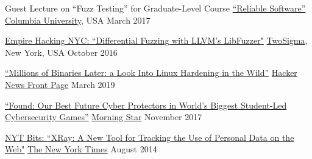 \vspace{0.025in}
\begin{cvhonorswide2}
\cvhonorwide
    {}
    {Guest Lecture on ``Fuzz Testing'' for Graduate-Level Course \href{http://www.cs.columbia.edu/~junfeng/17sp-e6121/syllabus.html}{``Reliable Software''}}
    {\href{http://www.cs.columbia.edu/}{Columbia University}, USA}
    {March 2017}
\end{cvhonorswide2}

\vspace{0.025in}
\begin{cvhonorswide2}
  \cvhonorwide
    {}
    {\href{https://www.meetup.com/Empire-Hacking/events/231863227/?_af=event&_af_eid=231863227&https=on}{Empire
            Hacking NYC: ``Differential Fuzzing with LLVM's LibFuzzer"}}
    {\href{https://www.twosigma.com/}{TwoSigma}, New York, USA}
    {October 2016}
\end{cvhonorswide2}

\vspace{0.025in}

\vspace{0.025in}
\begin{cvhonorswide2}
  \cvhonorwide
    {}
    {\href{https://capsule8.com/blog/millions-of-binaries-later-a-look-into-linux-hardening-in-the-wild/}{\footnotesize``Millions of Binaries Later: a Look Into Linux Hardening in the Wild''}}
    {\href{https://news.ycombinator.com/front?day=2019-03-02}{Hacker News Front Page}}
    {March 2019}
\end{cvhonorswide2}

\vspace{0.025in}
\begin{cvhonorswide2}
  \cvhonorwide
    {}
    {\href{https://www.prnewswire.com/news-releases/found-our-best-future-cyber-protectors-in-worlds-biggest-student-led-cybersecurity-games-300555690.html}{\footnotesize``Found:
    Our Best Future Cyber Protectors
    in World's Biggest Student-Led Cybersecurity Games''}}
    {\href{https://www.morningstar.com}{Morning Star}}
    {November 2017}
\end{cvhonorswide2}
\vspace{0.025in}

\begin{cvhonorswide2}
  \cvhonorwide
    {}
    {\href{http://bits.blogs.nytimes.com/2014/08/18/xray-a-new-tool-for-tracking-the-use-of-personal-data-on-the-web/}{NYT Bits:
    ``XRay: A New Tool for Tracking the Use of Personal Data on the Web"}}
    {\href{http://www.nytimes.com/}{The New York Times}}
    {August 2014}
\end{cvhonorswide2}
